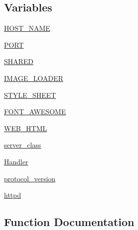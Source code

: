 \subsection*{Variables}
\begin{DoxyCompactItemize}
\item 
\hyperlink{namespaceprojects_1_1image__chat_1_1interactive_a9caa2a471f6fb7637f86ed68ab92d554}{H\+O\+S\+T\+\_\+\+N\+A\+ME}
\item 
\hyperlink{namespaceprojects_1_1image__chat_1_1interactive_a377a6f729efcfee287f01bec353907f1}{P\+O\+RT}
\item 
\hyperlink{namespaceprojects_1_1image__chat_1_1interactive_a590f27f0fc3c04218a1fcd6ee34092bc}{S\+H\+A\+R\+ED}
\item 
\hyperlink{namespaceprojects_1_1image__chat_1_1interactive_a5e49658669731b75d6a0de3f1d29bd7e}{I\+M\+A\+G\+E\+\_\+\+L\+O\+A\+D\+ER}
\item 
\hyperlink{namespaceprojects_1_1image__chat_1_1interactive_ac608e0d1cd8d7537f011126d9e83f906}{S\+T\+Y\+L\+E\+\_\+\+S\+H\+E\+ET}
\item 
\hyperlink{namespaceprojects_1_1image__chat_1_1interactive_a180951d02b686de24635f35e1a6dfbc5}{F\+O\+N\+T\+\_\+\+A\+W\+E\+S\+O\+ME}
\item 
\hyperlink{namespaceprojects_1_1image__chat_1_1interactive_a7fdf370bcd1898b37f197ac795c44b75}{W\+E\+B\+\_\+\+H\+T\+ML}
\item 
\hyperlink{namespaceprojects_1_1image__chat_1_1interactive_a54b092d0eb15cb8decf78688b1a6fe6d}{server\+\_\+class}
\item 
\hyperlink{namespaceprojects_1_1image__chat_1_1interactive_ac51164d011818446d45924028cd6183f}{Handler}
\item 
\hyperlink{namespaceprojects_1_1image__chat_1_1interactive_a24d446284e43e25d167faf0949848249}{protocol\+\_\+version}
\item 
\hyperlink{namespaceprojects_1_1image__chat_1_1interactive_a2c0d464fafcbcedd9b56aaf2a253e6ca}{httpd}
\end{DoxyCompactItemize}


\subsection{Function Documentation}
\mbox{\label{namespaceprojects_1_1image__chat_1_1interactive_a44c69eb8136c100209f99644e41407b0}} 
